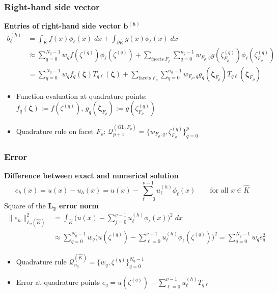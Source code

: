 \documentclass{beamer}
\begin{document}

\begin{frame}
\frametitle{Right-hand side vector}
\textbf{Entries of right-hand side vector $\boldsymbol{b^{(h)}}$}
$$
\begin{aligned}
b^{(h)}_\ell  &= \int_{\widehat{K}} f(x)\phi_\ell(x)\;dx + \int_{\partial \widehat{K}} g(x)\phi_\ell(x)\;dx\\
&\approx \sum_{q=0}^{N_q-1} w_q f(\zeta^{(q)}) \phi_\ell(\zeta^{(q)}) + \sum_{\text{facets}\;F_\rho} \sum_{q=0}^{n_q-1 }w_{F_\rho,q} g(\zeta_{F_\rho}^{(q)})\phi_\ell(\zeta_{F_\rho}^{(q)}) \\
&= \sum_{q=0}^{N_q-1} w_q f_q(\boldsymbol{\zeta}) T_{q\ell}(\boldsymbol{\zeta}) + \sum_{\text{facets}\;F_\rho} \sum_{q=0}^{n_q-1 }w_{F_\rho,q} g_{q}(\boldsymbol{\zeta}_{F_\rho})T_{q\ell}(\boldsymbol{\zeta}_{F_\rho})
\end{aligned}
$$
\begin{itemize}
  \item Function evaluation at quadrature points:\\$f_q(\boldsymbol{\zeta}):=f(\zeta^{(q)})$, $g_{q}(\boldsymbol{\zeta}_{F_\rho}) := g(\zeta_{F_\rho}^{(q)})$
  \item Quadrature rule on facet $F_\rho$: $\mathcal{Q}_{p+1}^{(\text{GL},F_\rho)} = \{w_{F_\rho,q},\zeta^{(q)}_{F_\rho}\}_{q=0}^{p}$
\end{itemize}
\end{frame}


\begin{frame}
\frametitle{Error}
 \textbf{Difference between exact and numerical solution}
$$
e_h(x) = u(x)-u_h(x) = u(x) - \sum_{\ell=0}^{\nu-1} u^{(h)}_\ell \phi_\ell(x)\qquad\text{for all $x\in\widehat{K}$}
$$
Square of the \textbf{$\boldsymbol{L_2}$ error norm}
$$
\begin{aligned}
\|e_h\|_{L_2(\widehat{K})}^2 &= \int_{\widehat{K}} \Big(u(x) - \sum_{j=0}^{\nu-1} u^{(h)}_\ell \phi_\ell(x)\Big)^2\;dx\\
&\approx 
\sum_{q=0} ^{N_q-1} w_q \Big(u(\zeta^{(q)}) - \sum_{\ell=0}^{\nu-1} u^{(h)}_\ell \phi_\ell(\zeta^{(q)})\Big)^2 = \sum_{q=0} ^{N_q-1} w_q e_q^2
\end{aligned}
$$
\begin{itemize}
\item Quadrature rule $\mathcal{Q}_{n_q}^{(\widehat{K})}=\{w_q,\zeta^{(q)}\}_{q=0}^{N_q-1}$
\item Error at quadrature points $e_q = u(\zeta^{(q)}) - \sum_{\ell=0}^{\nu-1} u^{(h)}_\ell T_{q\ell}$
\end{itemize}
\end{frame}
\end{document}
